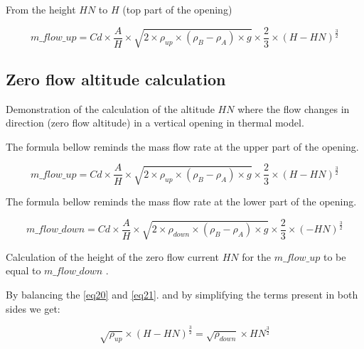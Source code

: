 \documentclass[a4paper, english]{article}
\begin{document}
            From the height $ HN $ to $ H $  (top part of the opening)
            
            \begin{equation} 
            \label{eq21}
                m\_flow\_up = Cd \times \frac{A}{H} \times \sqrt{ 2 \times \rho_{up} \times ( \rho_B - \rho_A ) \times g } \times \frac{2}{3} \times {( H - HN)}^\frac{3}{2}
            \end{equation}     
        

        \subsection{Zero flow altitude calculation}
    
            Demonstration of the calculation of the altitude $ HN $ where the flow changes in direction (zero flow altitude) in a vertical opening in thermal model.
            
            The formula bellow reminds the mass flow rate at the upper part of the opening.
            
            \begin{equation*} 
                m\_flow\_up = Cd \times \frac{A}{H} \times \sqrt{ 2 \times \rho_{up} \times ( \rho_B - \rho_A ) \times g } \times \frac{2}{3} \times {( H - HN)}^\frac{3}{2}
            \end{equation*} 

            The formula bellow reminds the mass flow rate at the lower part of the opening.

            \begin{equation*} 
                m\_flow\_down = Cd \times \frac{A}{H} \times \sqrt{ 2 \times \rho_{down} \times ( \rho_B - \rho_A ) \times g } \times \frac{2}{3} \times {(-HN)}^\frac{3}{2}
            \end{equation*} 

            Calculation of the height of the zero flow current $ HN $ for the $ m\_flow\_up $ to be equal to $ m\_flow\_down $ .
            
            By balancing the \eqref{eq20} and \eqref{eq21}. and by simplifying the terms present in both sides we get:
            
            \begin{equation*}
                \sqrt{ \rho _{up} } \times (H - HN)^{\frac{3}{2}} = \sqrt{ \rho _{down} }  \times HN^{\frac{3}{2}}
            \end{equation*} 
            
\end{document}
